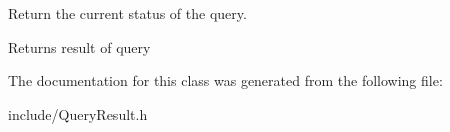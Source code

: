 Return the current status of the query. 

\begin{DoxyReturn}{Returns}
result of query 
\end{DoxyReturn}


The documentation for this class was generated from the following file\+:\begin{DoxyCompactItemize}
\item 
include/Query\+Result.\+h\end{DoxyCompactItemize}
